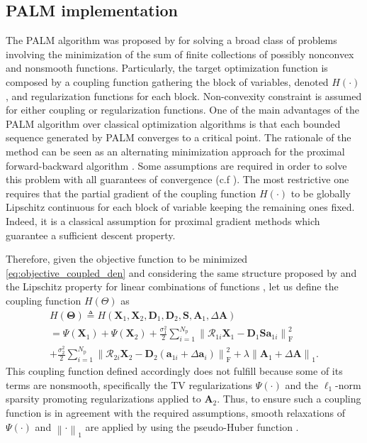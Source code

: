 \documentclass[review]{elsarticle}
\newcommand{\Npatch}{N_{\mathrm{p}}}
\begin{document}
\subsection{PALM implementation}
The PALM algorithm was proposed by \citet{bolte_proximal_2014} for solving a broad class of problems involving the minimization of the sum of finite collections of possibly nonconvex and nonsmooth functions. Particularly, the target optimization function is composed by a coupling function gathering the block of variables, denoted $H(\cdot)$, and regularization functions for each block. Non-convexity constraint is assumed for either coupling or regularization functions. One of the main advantages of the PALM algorithm over classical optimization algorithms is that each bounded sequence generated by PALM converges to a critical point. The rationale of the method can be seen as an alternating minimization approach for the proximal forward-backward algorithm \citep{combettes_signal_2005}. Some assumptions are required in order to solve this problem with all guarantees of convergence (c.f \citep[Assumption~1, Assumption~2]{bolte_proximal_2014}). The most restrictive one \citep[Assumption~2(ii)]{bolte_proximal_2014} requires that the partial gradient of the coupling function $H(\cdot)$ to be globally Lipschitz continuous for each block of variable keeping the remaining ones fixed. Indeed, it is a classical assumption for proximal gradient methods which guarantee a sufficient descent property.

Therefore, given the objective function to be minimized \eqref{eq:objective_coupled_den} and considering the same structure proposed by \citet{bolte_proximal_2014} and the Lipschitz property for linear combinations of functions \citep{eriksson_lipschitz_2004}, let us define the coupling function $H(\Theta)$ as
\begin{multline}
	\label{eq:objective_coupled_term}
  H\left(\boldsymbol{\Theta}\right) \triangleq  H\left(\mathbf{X}_{1},\mathbf{X}_{2},\mathbf{D}_{1},\mathbf{D}_{2},\mathbf{S},\mathbf{A}_{1},\Delta\mathbf{A}\right)  \\
 =\Psi\left(\mathbf{X}_{1}\right)   + \Psi\left(\mathbf{X}_{2}\right) + \frac{\sigma_{1}^2}{2}\sum_{i=1}^{\Npatch}\left\|\mathcal{R}_{1{i}}\mathbf{X}_{1} - \mathbf{D}_{1}\mathbf{S}\mathbf{a}_{1{i}}\right\|_{\mathrm{F}}^{2}\\
  +\frac{\sigma_{2}^2}{2}\sum_{i=1}^{\Npatch}\left\|\mathcal{R}_{2{i}}\mathbf{X}_{2} - \mathbf{D}_{2}\left(\mathbf{a}_{1{i}} + \Delta\mathbf{a}_{i}\right)\right\|_{\mathrm{F}}^{2} +  \lambda \left\|\mathbf{A}_{1}+\Delta\mathbf{A}\right\|_1.
\end{multline}
This coupling function defined accordingly does not fulfill
\citep[Assumption~2(ii)]{bolte_proximal_2014} because some of its terms are nonsmooth, specifically the TV regularizations $\Psi(\cdot)$ and the $\ell_{1}$-norm sparsity promoting regularizations applied to $\mathbf{A}_{2}$. Thus, to ensure such a coupling function is in agreement with the required assumptions, smooth relaxations of $\Psi(\cdot)$ and $\left\|\cdot\right\|_1$ are applied by using the pseudo-Huber function  \citep{fountoulakis_second_2016,jensen_implementation_2012}.
\end{document}
